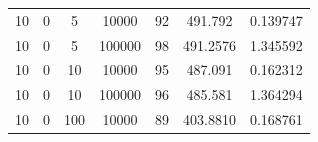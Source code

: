 \documentclass[11pt,a4paper]{report}
\begin{document}
\begin{table}[H]
{\begin{tabular}{c|c|c|c|c|c|c}
10                                                                                   & 0                                                                                      & 5                                                                          & 10000                                                                     & 92                                                                                        & 491.792                                                                   & 0.139747              \\
10                                                                                   & 0                                                                                      & 5                                                                          & 100000                                                                    & 98                                                                                        & 491.2576                                                                  & 1.345592              \\ \hline
10                                                                                   & 0                                                                                      & 10                                                                         & 10000                                                                     & 95                                                                                        & 487.091                                                                   & 0.162312              \\
10                                                                                   & 0                                                                                      & 10                                                                         & 100000                                                                    & 96                                                                                        & 485.581                                                                   & 1.364294              \\ \hline
10                                                                                   & 0                                                                                      & 100                                                                        & 10000                                                                     & 89                                                                                        & 403.8810                                                                  & 0.168761              \\

\end{tabular}}
\end{table}
\end{document}
